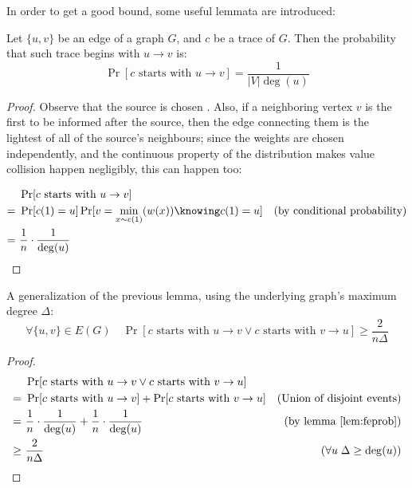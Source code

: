 In order to get a good bound, some useful lemmata are introduced:

\begin{lemma}\label{lem:feprob} Let $\{u, v\}$ be an edge of a graph $G$, and $c$ be a trace of $G$. Then the probability that such trace begins with $u \to v$ is:
    \[
        \Pr[c \text{ starts with } u \to v] = \frac{1}{|V| \deg(u)}
    \]
    
\end{lemma}

\begin{proof}
    Observe that the source is chosen \uar{}. Also, if a neighboring vertex $v$ is the first to be informed after the source, then the edge connecting them is the lightest of all of the source's neighbours; since the weights are chosen independently, and the continuous property of the distribution makes value collision happen negligibly, this can happen \uar{} too: 

    \begin{align*}
         &\ \Pr[c \text{ starts with } u \to v]                                 & \\
        =&\ \Pr[c(1) = u] \Pr[v = \min_{x \sim c(1)}(w(x)) \knowing c(1) = u]   & \text{(by conditional probability)} \\
        =&\ \frac{1}{n} \cdot \frac{1}{\deg(u)}                                 & \\
    \end{align*}
\end{proof}

\begin{lemma}\label{lem:gen-feprob} A generalization of the previous lemma, using the underlying graph's maximum degree $\Delta$:
    \[
        \forall \{u, v\} \in E(G) \quad \Pr[c \text{ starts with } u \to v \vee c \text{ starts with } v \to u] \geq \frac{2}{n \Delta}
    \]
\end{lemma}

\begin{proof}
    \begin{align*}
            &\ \Pr[c \text{ starts with } u \to v \vee c \text{ starts with } v \to u]      & \\
           =&\ \Pr[c \text{ starts with } u \to v] + \Pr[c \text{ starts with } v \to u]    & \text{(Union of disjoint events)} \\
           =&\ \frac{1}{n} \cdot \frac{1}{\deg(u)} + \frac{1}{n} \cdot \frac{1}{\deg(u)}    & \text{(by lemma \ref{lem:feprob})}\\
        \geq&\ \frac{2}{n \Delta}                                                           & (\forall u \; \Delta \geq \deg(u)) \\
    \end{align*}
\end{proof}


